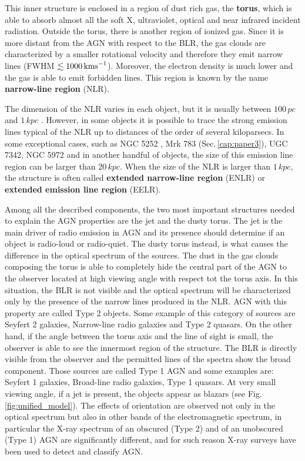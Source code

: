\documentclass[../main.tex]{subfiles}
\begin{document}
This inner structure is enclosed in a region of dust rich gas, the \textbf{torus}, which is able to absorb almost all the soft X, ultraviolet, optical and near infrared incident radiation.
Outside the torus, there is another region of ionized gas.
Since it is more distant from the AGN with respect to the BLR, the gas clouds are characterized by a smaller rotational velocity and therefore they emit narrow lines (FWHM $\lesssim 1000\,\si{\kms}$).
Moreover, the electron density is much lower and the gas is able to emit forbidden lines.
This region is known by the name \textbf{narrow-line region} (NLR).

The dimension of the NLR varies in each object, but it is usually between $100\,\si{pc}$ and $1\,\si{kpc}$ \citep{Beckmann12}.
However, in some objects it is possible to trace the strong emission lines typical of the NLR up to distances of the order of several kiloparsecs.
In some exceptional cases, such as NGC 5252 \citep{Tadhunter89}, Mrk 783 (Sec.\,\ref{cap:paper3}), UGC 7342, NGC 5972 \citep{Keel12} and in another handful of objects, the size of this emission line region can be larger than $20\,\si{kpc}$.
When the size of the NLR is larger than $1\,\si{kpc}$, the structure is often called \textbf{extended narrow-line region} (ENLR) or \textbf{extended emission line region} (EELR).

Among all the described components, the two most important structures needed to explain the AGN properties are the jet and the dusty torus.
The jet is the main driver of radio emission in AGN and its presence should determine if an object is radio-loud or radio-quiet.
The dusty torus instead, is what causes the difference in the optical spectrum of the sources.
The dust in the gas clouds composing the torus is able to completely hide the central part of the AGN to the observer located at high viewing angle with respect tot the torus axis.
In this situation, the BLR is not visible and the optical spectrum will be characterized only by the presence of the narrow lines produced in the NLR.
AGN with this property are called Type 2 objects.
Some example of this category of sources are Seyfert 2 galaxies, Narrow-line radio galaxies and Type 2 quasars.
On the other hand, if the angle between the torus axis and the line of sight is small, the observer is able to see the innermost region of the structure.
The BLR is directly visible from the observer and the permitted lines of the spectra show the broad component.
Those sources are called Type 1 AGN and some examples are: Seyfert 1 galaxies, Broad-line radio galaxies, Type 1 quasars.
At very small viewing angle, if a jet is present, the objects appear as blazars (see Fig.\,\ref{fig:unified_model}).
The effects of orientation are observed not only in the optical spectrum but also in other bands of the electromagnetic spectrum, in particular the X-ray spectrum of an obscured (Type 2) and of an unobscured (Type 1) AGN are significantly different, and for such reason X-ray surveys have been used to detect and classify AGN. 
\end{document}
